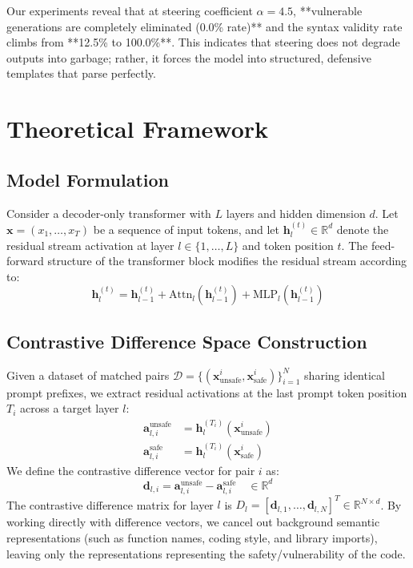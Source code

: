 \documentclass[journal, onecolumn]{IEEEtran}
\begin{document}
Our experiments reveal that at steering coefficient $\alpha = 4.5$, **vulnerable generations are completely eliminated (0.0\% rate)** and the syntax validity rate climbs from **12.5\% to 100.0\%**. This indicates that steering does not degrade outputs into garbage; rather, it forces the model into structured, defensive templates that parse perfectly.

\section{Theoretical Framework}
\label{sec:theory}

\subsection{Model Formulation}
Consider a decoder-only transformer with $L$ layers and hidden dimension $d$. Let $\bm{x} = (x_1, \ldots, x_T)$ be a sequence of input tokens, and let $\bm{h}_l^{(t)} \in \mathbb{R}^d$ denote the residual stream activation at layer $l \in \{1, \ldots, L\}$ and token position $t$. The feed-forward structure of the transformer block modifies the residual stream according to:
\begin{equation}
    \bm{h}_l^{(t)} = \bm{h}_{l-1}^{(t)} + \text{Attn}_l(\bm{h}_{l-1}^{(t)}) + \text{MLP}_l(\bm{h}_{l-1}^{(t)})
    \label{eq:residual_layer}
\end{equation}

\subsection{Contrastive Difference Space Construction}
Given a dataset of matched pairs $\mathcal{D} = \{(\bm{x}^i_{\text{unsafe}}, \bm{x}^i_{\text{safe}})\}_{i=1}^N$ sharing identical prompt prefixes, we extract residual activations at the last prompt token position $T_i$ across a target layer $l$:
\begin{align}
    \bm{a}_{l, i}^{\text{unsafe}} &= \bm{h}_l^{(T_i)}(\bm{x}^i_{\text{unsafe}}) \\
    \bm{a}_{l, i}^{\text{safe}} &= \bm{h}_l^{(T_i)}(\bm{x}^i_{\text{safe}})
\end{align}
We define the contrastive difference vector for pair $i$ as:
\begin{equation}
    \bm{d}_{l, i} = \bm{a}_{l, i}^{\text{unsafe}} - \bm{a}_{l, i}^{\text{safe}} \quad \in \mathbb{R}^d
\end{equation}
The contrastive difference matrix for layer $l$ is $D_l = [\bm{d}_{l, 1}, \ldots, \bm{d}_{l, N}]^T \in \mathbb{R}^{N \times d}$. By working directly with difference vectors, we cancel out background semantic representations (such as function names, coding style, and library imports), leaving only the representations representing the safety/vulnerability of the code.
\end{document}
